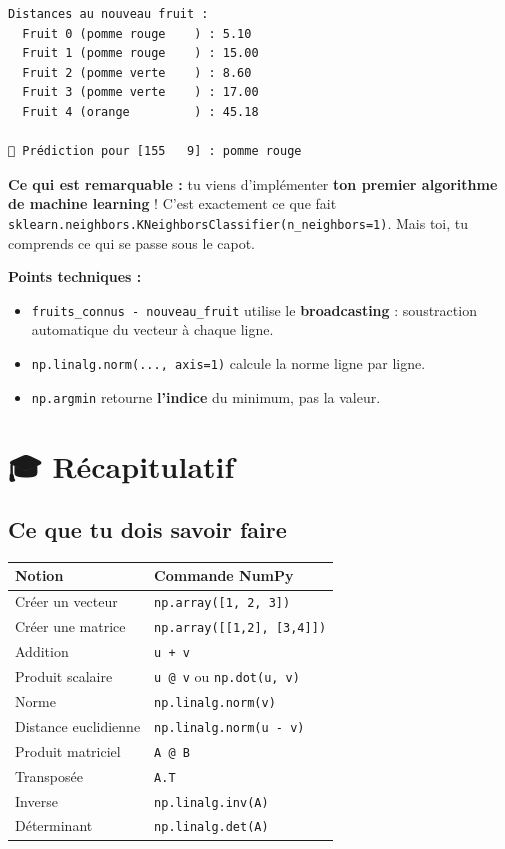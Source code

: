 \documentclass[
  french,
  11pt,
  a4paper,
]{scrbook}
\newcounter{none} %
\providecommand{\tightlist}{%
  \setlength{\itemsep}{0pt}\setlength{\parskip}{0pt}}
\begin{document}
\begin{tcolorbox}
\begin{verbatim}
Distances au nouveau fruit :
  Fruit 0 (pomme rouge    ) : 5.10
  Fruit 1 (pomme rouge    ) : 15.00
  Fruit 2 (pomme verte    ) : 8.60
  Fruit 3 (pomme verte    ) : 17.00
  Fruit 4 (orange         ) : 45.18

🎯 Prédiction pour [155   9] : pomme rouge
\end{verbatim}

\textbf{Ce qui est remarquable :} tu viens d'implémenter \textbf{ton
premier algorithme de machine learning} ! C'est exactement ce que fait
\texttt{sklearn.neighbors.KNeighborsClassifier(n\_neighbors=1)}. Mais
toi, tu comprends ce qui se passe sous le capot.

\textbf{Points techniques :}

\begin{itemize}
\tightlist
\item
  \texttt{fruits\_connus\ -\ nouveau\_fruit} utilise le
  \textbf{broadcasting} : soustraction automatique du vecteur à chaque
  ligne.
\item
  \texttt{np.linalg.norm(...,\ axis=1)} calcule la norme ligne par
  ligne.
\item
  \texttt{np.argmin} retourne \textbf{l'indice} du minimum, pas la
  valeur.
\end{itemize}

\end{tcolorbox}

\chapter{🎓 Récapitulatif}\label{ruxe9capitulatif}

\section{Ce que tu dois savoir faire}\label{ce-que-tu-dois-savoir-faire}

{\def\LTcaptype{none} %
\begin{longtable}[]{@{}ll@{}}
\toprule\noalign{}
Notion & Commande NumPy \\
\midrule\noalign{}
\endhead
\bottomrule\noalign{}
\endlastfoot
Créer un vecteur & \texttt{np.array({[}1,\ 2,\ 3{]})} \\
Créer une matrice & \texttt{np.array({[}{[}1,2{]},\ {[}3,4{]}{]})} \\
Addition & \texttt{u\ +\ v} \\
Produit scalaire & \texttt{u\ @\ v} ou \texttt{np.dot(u,\ v)} \\
Norme & \texttt{np.linalg.norm(v)} \\
Distance euclidienne & \texttt{np.linalg.norm(u\ -\ v)} \\
Produit matriciel & \texttt{A\ @\ B} \\
Transposée & \texttt{A.T} \\
Inverse & \texttt{np.linalg.inv(A)} \\
Déterminant & \texttt{np.linalg.det(A)} \\
\end{longtable}
}
\end{document}
